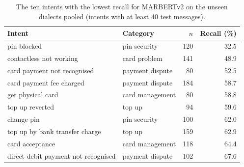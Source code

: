 \begin{table}[t]\centering\small\caption{The ten intents with the lowest recall for MARBERTv2 on the unseen dialects pooled (intents with at least 40 test messages).}\label{tab:hardest}
\begin{tabular}{llrr}\toprule
Intent & Category & $n$ & Recall (\%) \\\midrule
pin blocked & pin security & 120 & 32.5 \\
contactless not working & card problem & 141 & 48.9 \\
card payment not recognised & payment dispute & 80 & 52.5 \\
card payment fee charged & payment dispute & 184 & 58.7 \\
get physical card & card management & 80 & 58.8 \\
top up reverted & top up & 94 & 59.6 \\
change pin & pin security & 100 & 62.0 \\
top up by bank transfer charge & top up & 159 & 62.9 \\
card acceptance & card management & 118 & 64.4 \\
direct debit payment not recognised & payment dispute & 102 & 67.6 \\
\bottomrule\end{tabular}\end{table}
